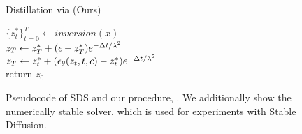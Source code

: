 \begin{figure}[h!]
\begin{minipage}[t]{.45\textwidth}
\begin{algorithm}[H]
{        
    }
    \end{algorithm}
\end{minipage}
\hspace{0.7cm}
\begin{minipage}[t]{.47\textwidth}
    \centering
    \begin{algorithm}[H]
    \caption{Distillation via \methodname (Ours)} \label{alg:msg}
     {
        $\{z^*_t\}^T_{t=0} \gets inversion(x)$\\
        $z_T \gets  z^{*}_T  +  (\epsilon - z^{*}_T) e^{- \Delta t / \lambda^2} $\\
        {
            $z_T \gets z^{*}_t +  (\epsilon_\theta(z_t, t, c) - z^{*}_t) e^{- \Delta t / \lambda^2} $\\
        }
        return $z_0$\\
    }
    \end{algorithm}
\end{minipage}
\caption{
    Pseudocode of SDS and our procedure, \methodname. We additionally show the numerically stable solver, which is used for experiments with Stable Diffusion.
}
\label{alg:sds_vs_ours}
\end{figure}

